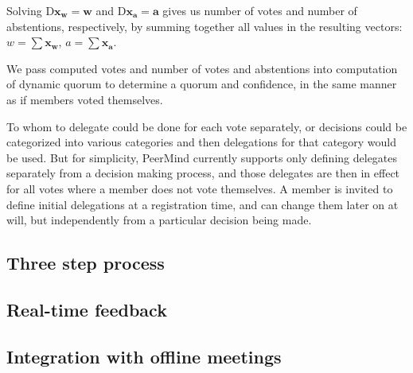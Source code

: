 \documentclass{sigchi}
\begin{document}
Solving $\mathrm{D} \mathbf{x_w} = \mathbf{w}$ and $\mathrm{D} \mathbf{x_a} = \mathbf{a}$ gives
us number of votes and number of abstentions, respectively, by summing together all values in the
resulting vectors: $w = \sum \mathbf{x_w}$, $a = \sum \mathbf{x_a}$.


We pass computed votes and number of votes and abstentions into computation of dynamic quorum to determine
a quorum and confidence, in the same manner as if members voted themselves.

To whom to delegate could be done for each vote separately, or decisions could be categorized into various
categories and then delegations for that category would be used.
But for simplicity, PeerMind currently supports only defining delegates separately from a decision making process,
and those delegates are then in effect for all votes where a member does not vote themselves.
A member is invited to define initial delegations at a registration time, and can change them later on at will,
but independently from a particular decision being made.

\subsection{Three step process}

\subsection{Real-time feedback}



\subsection{Integration with offline meetings}



\end{document}
